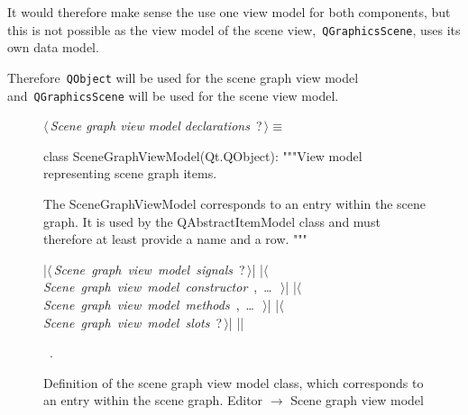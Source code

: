 \documentclass[%
    a4paper,    %
    justified,  %
    nobib,      %
    openany     %
]{tufte-book}
\begin{document}
It would therefore make sense the use one view model for both components, but
this is not possible as the view model of the scene view,~\verb=QGraphicsScene=,
uses its own data model.

Therefore~\verb=QObject= will be used for the scene graph view model
and~\verb=QGraphicsScene= will be used for the scene view model.

\begin{figure}
\begin{flushleft} \small
\begin{minipage}{\linewidth}\label{scrap23}\raggedright\small
{} $\langle\,${\itshape Scene graph view model declarations}\nobreak\ {\footnotesize {?}}$\,\rangle\equiv$
\vspace{-1ex}
\begin{pythoncode}
class SceneGraphViewModel(Qt.QObject):
    """View model representing scene graph items.

    The SceneGraphViewModel corresponds to an entry within the
    scene graph. It is used by the QAbstractItemModel class and
    must therefore at least provide a name and a row.
    """

    |\hbox{$\langle\,${\itshape Scene graph view model signals}\nobreak\ {\footnotesize ?}$\,\rangle$}|
    |\hbox{$\langle\,${\itshape Scene graph view model constructor}\nobreak\ {\footnotesize {}, \ldots\ }$\,\rangle$}|
    |\hbox{$\langle\,${\itshape Scene graph view model methods}\nobreak\ {\footnotesize {}, \ldots\ }$\,\rangle$}|
    |\hbox{$\langle\,${\itshape Scene graph view model slots}\nobreak\ {\footnotesize ?}$\,\rangle$}|
|\NWsep|
\end{pythoncode}
\vspace{1.5ex}
\footnotesize
\begin{list}{}{\setlength{\itemsep}{-\parsep}\setlength{\itemindent}{-\leftmargin}}
\item \NWtxtMacroRefIn\ .

\item{}
\end{list}
\end{minipage}\vspace{4ex}
\end{flushleft}
\caption{Definition of the scene graph view model class, which corresponds to an
  entry within the scene graph.
  \newline{}\newline{}Editor $\rightarrow$ Scene graph view model}
\label{editor:lst:scene-graph-view-model}
\end{figure}
\end{document}

